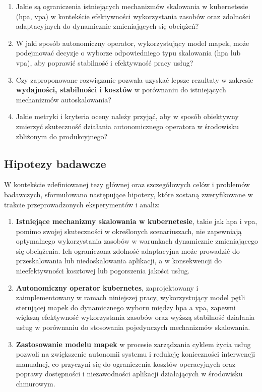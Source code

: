 \begin{enumerate}
    \item Jakie są ograniczenia istniejących mechanizmów skalowania w \Gls{kubernetes}ie 
    (\Gls{hpa}, \Gls{vpa}) w kontekście efektywności wykorzystania zasobów oraz zdolności 
    adaptacyjnych do dynamicznie zmieniających się obciążeń?
    
    \item W jaki sposób autonomiczny operator, wykorzystujący model \Gls{mapek}, może podejmować 
    decyzje o wyborze odpowiedniego typu skalowania (\Gls{hpa} lub \Gls{vpa}), aby poprawić 
    stabilność i efektywność pracy usług?
    
    \item Czy zaproponowane rozwiązanie pozwala uzyskać lepsze rezultaty w zakresie 
    \textbf{wydajności, stabilności i kosztów} w porównaniu do istniejących mechanizmów 
    autoskalowania?
    
    \item Jakie metryki i kryteria oceny należy przyjąć, aby w sposób obiektywny zmierzyć 
    skuteczność działania autonomicznego operatora w środowisku zbliżonym do produkcyjnego?
\end{enumerate}


\subsection{Hipotezy badawcze}

W kontekście zdefiniowanej tezy głównej oraz szczegółowych celów i problemów badawczych, 
sformułowano następujące hipotezy, które zostaną zweryfikowane w trakcie przeprowadzonych 
eksperymentów i analiz:

\begin{enumerate}
    \item \textbf{Istniejące mechanizmy skalowania w \Gls{kubernetes}ie}, takie jak \gls{hpa} 
    i \gls{vpa}, pomimo swojej skuteczności w określonych scenariuszach, nie zapewniają optymalnego 
    wykorzystania zasobów w warunkach dynamicznie zmieniającego się obciążenia. Ich ograniczona 
    zdolność adaptacyjna może prowadzić do przeskalowania lub niedoskalowania aplikacji, a w 
    konsekwencji do nieefektywności kosztowej lub pogorszenia jakości usług.
    
    \item \textbf{Autonomiczny operator \Gls{kubernetes}}, zaprojektowany i zaimplementowany 
    w ramach niniejszej pracy, wykorzystujący model pętli sterującej \gls{mapek} do dynamicznego 
    wyboru między \gls{hpa} a \gls{vpa}, zapewni większą efektywność wykorzystania zasobów oraz 
    wyższą stabilność działania usług w porównaniu do stosowania pojedynczych mechanizmów skalowania.
    
    \item \textbf{Zastosowanie modelu \gls{mapek}} w procesie zarządzania cyklem życia usług 
    pozwoli na zwiększenie autonomii systemu i redukcję konieczności interwencji manualnej, 
    co przyczyni się do ograniczenia kosztów operacyjnych oraz poprawy dostępności i niezawodności 
    aplikacji działających w środowisku chmurowym.
\end{enumerate}


